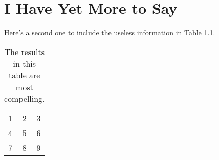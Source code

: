 \chapter{I Have Yet More to Say}
Here's a second one to include the useless information in Table \ref{tab:useless}.

\begin{table}[h]
\centering
\caption{The results in this table are most compelling.}
\begin{tabular}{ l c r }
  1 & 2 & 3 \\
  4 & 5 & 6 \\
  7 & 8 & 9 \\
 \end{tabular}\label{tab:useless}
\end{table}
